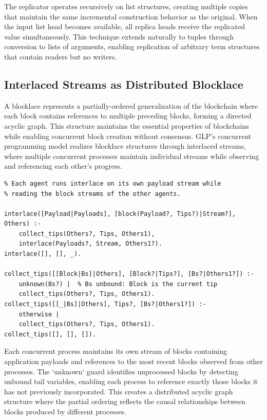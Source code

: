 The replicator operates recursively on list structures, creating multiple copies that maintain the same incremental construction behavior as the original. When the input list head becomes available, all replica heads receive the replicated value simultaneously. This technique extends naturally to tuples through conversion to lists of arguments, enabling replication of arbitrary term structures that contain readers but no writers.

\subsection{Interlaced Streams as Distributed Blocklace}

A blocklace represents a partially-ordered generalization of the blockchain where each block contains references to multiple preceding blocks, forming a directed acyclic graph. This structure maintains the essential properties of blockchains while enabling concurrent block creation without consensus. GLP's concurrent programming model realizes blocklace structures through interlaced streams, where multiple concurrent processes maintain individual streams while observing and referencing each other's progress.

\label{program:interlaced-streams}
\begin{verbatim}
% Each agent runs interlace on its own payload stream while
% reading the block streams of the other agents.

interlace([Payload|Payloads], [block(Payload?, Tips?)|Stream?], Others) :-
    collect_tips(Others?, Tips, Others1),
    interlace(Payloads?, Stream, Others1?).
interlace([], [], _).

collect_tips([[Block|Bs]|Others], [Block?|Tips?], [Bs?|Others1?]) :-
    unknown(Bs?) |  % Bs unbound: Block is the current tip
    collect_tips(Others?, Tips, Others1).
collect_tips([[_|Bs]|Others], Tips?, [Bs?|Others1?]) :-
    otherwise |
    collect_tips(Others?, Tips, Others1).
collect_tips([], [], []).
\end{verbatim}

Each concurrent process maintains its own stream of blocks containing application payloads and references to the most recent blocks observed from other processes. The `unknown` guard identifies unprocessed blocks by detecting unbound tail variables, enabling each process to reference exactly those blocks it has not previously incorporated. This creates a distributed acyclic graph structure where the partial ordering reflects the causal relationships between blocks produced by different processes.


